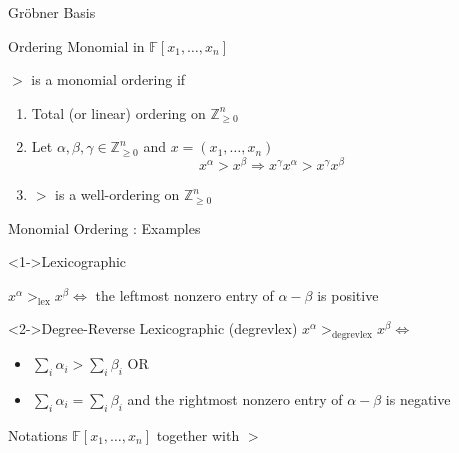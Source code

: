 \documentclass{beamer}
\newcommand{\Field}{\mathbb{F}}
\newcommand{\mpolyring}[3]{#1[#2_{1}, \ldots, #2_{#3}]}
\newcommand{\Grobner}{Gr\"{o}bner }
\newcommand{\ZZ}{\mathbb{Z}}
\begin{document}
\begin{section}{\Grobner Basis}
  \begin{frame}{Ordering Monomial in $\mpolyring{\Field}{x}{n}$}
    \begin{definition}
      $>$ is a monomial ordering if
      \begin{enumerate}
      \item<2-> Total (or linear) ordering on $\ZZ_{\geq 0}^{n}$
      \item<3-> Let $\alpha, \beta, \gamma \in \ZZ_{\geq 0}^n$ and $x = (x_1, \ldots, x_n)$
        $$
        x^{\alpha} > x^{\beta} \Rightarrow x^{\gamma} x^{\alpha} > x^{\gamma} x^{\beta}
        $$
        \item<4-> $>$ is a well-ordering on $\ZZ_{\geq 0}^n$
      \end{enumerate}
    \end{definition}
  \end{frame}

  \begin{frame}{Monomial Ordering : Examples}
    \begin{block}<1->{Lexicographic}
      \begin{center}
        $x^{\alpha} >_{\mathrm{lex}} x^{\beta} \Leftrightarrow$ the leftmost nonzero entry of $\alpha - \beta$ is positive
      \end{center}
    \end{block}

    \begin{block}<2->{Degree-Reverse Lexicographic (degrevlex)}
      $x^{\alpha} >_{\mathrm{degrevlex}} x^{\beta} \Leftrightarrow$
      \begin{itemize}
      \item<3-> $\sum_{i} \alpha_i > \sum_{i} \beta_i$ \quad OR
      \item<4-> $\sum_{i} \alpha_i = \sum_{i} \beta_i$ and the rightmost nonzero entry of $\alpha - \beta$ is negative
      \end{itemize}
    \end{block}
  \end{frame}

  \begin{frame}{Notations}
    $\mpolyring{\Field}{x}{n}$ together with $>$


\end{frame}
\end{section}
\end{document}
